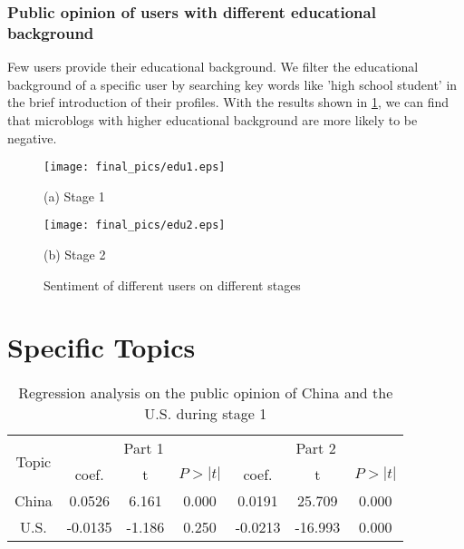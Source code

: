 \documentclass[sigconf, nonacm=true]{acmart}
\begin{document}
\subsubsection{Public opinion of users with different educational background}
Few users provide their educational background. We filter the educational background of a specific user by searching key words like 'high school student' in the brief introduction of their profiles.
With the results shown in \ref{figure:edu}, we can find that microblogs with higher educational background are more likely to be negative.
\begin{figure}[t]
\begin{minipage}[b]{0.49\linewidth}
\centering
\texttt{[image: final\_pics/edu1.eps]}
\vspace{-0.3cm}
\centerline{(a) Stage 1}
\end{minipage}
\begin{minipage}[b]{0.49\linewidth}
\centering
\texttt{[image: final\_pics/edu2.eps]}
\vspace{-0.3cm}
\centerline{(b) Stage 2}
\end{minipage}
\caption{Sentiment of different users on different stages}
\vspace{-0.3cm}
 \label{figure:edu}
 \end{figure}
 
\section{Specific Topics}
\begin{table}[h]
\small%
\begin{tabular}{|c|c|c|c|c|c|c|}
\hline
\multirow{2}{*}{Topic} & \multicolumn{3}{c|}{Part 1} & \multicolumn{3}{c|}{Part 2} \\\cline{2-7}
                  &  coef.     &    t   &   $P>|t|$   &     coef.  &    t   &  $P>|t|$    \\\hline
                  China&  0.0526   &     6.161    &   0.000       &   0.0191  &    25.709   &   0.000    \\\hline
                  U.S.  &      -0.0135  &   -1.186   &      0.250      &  -0.0213  &   -16.993  &     0.000         \\\hline
\end{tabular}
\vspace{0.2cm}
\caption{Regression analysis on the public opinion of China and the U.S. during stage 1}
\vspace{-0.1cm}
\label{table:stage1_si_gov}
\end{table}
\end{document}

